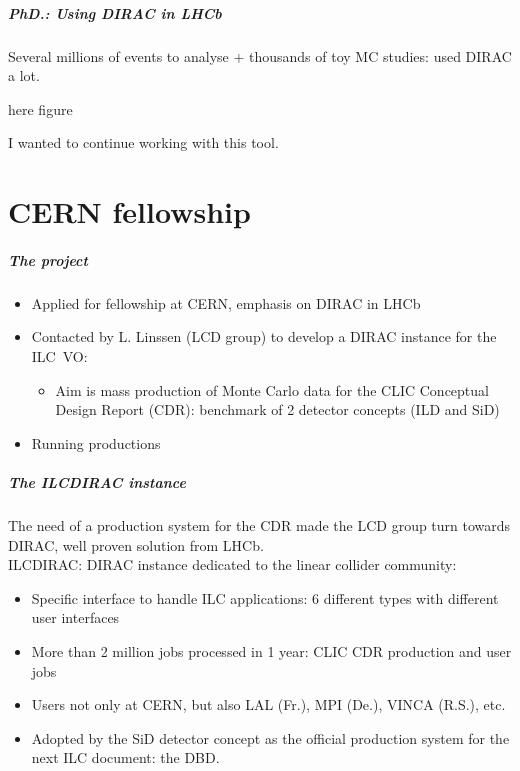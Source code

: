 \documentclass{beamer}
\begin{document}
\begin{frame}
\frametitle{PhD.: Using DIRAC in LHCb}
Several {\color{blue}millions of events} to analyse + {\color{blue}thousands of
toy MC studies}: used DIRAC a lot.
\begin{center}
here figure
\end{center}
I wanted to \alert{continue working with this tool}.
\end{frame}

\part{CERN fellowship}
\begin{frame}
\partpage
\end{frame}
\begin{frame}
\frametitle{The project}
\begin{itemize}
  \item Applied for \alert{fellowship at CERN}, emphasis on {\color{blue}DIRAC
  in LHCb}
  \item Contacted by L. Linssen ({\color{blue}LCD group}) to develop a
  \alert{DIRAC instance for the ILC~VO}:\\ 
  \begin{itemize}  
    \item Aim is \alert{mass production of Monte Carlo data} for the CLIC
    Conceptual Design Report (CDR): {\color{blue}benchmark of 2 detector
    concepts} (ILD and SiD)
  \end{itemize}
  \item Running productions
\end{itemize}
\end{frame}

\begin{frame}
\frametitle{The ILCDIRAC instance}
The need of a {\color{blue}production system for the CDR} made the LCD group
turn towards DIRAC, well proven solution from LHCb.\\
ILCDIRAC: DIRAC instance dedicated to the {\color{blue}linear collider
community}:
\begin{itemize}
  \item Specific interface to handle ILC applications: 6 different types with
  different user interfaces
  \item More than {\color{blue}2 million jobs processed in 1 year}: CLIC CDR
  production and user jobs
  \item Users not only at CERN, but also LAL (Fr.), MPI (De.), VINCA (R.S.),
  etc.
  \item {\color{blue}Adopted by the SiD detector concept} as the official
  production system for the next ILC document: the DBD.
\end{itemize}

\end{frame}
\end{document}
